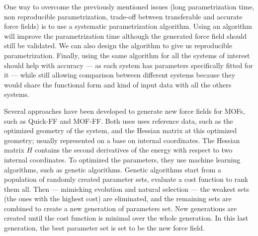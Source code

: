 \documentclass[thesis]{subfiles}
\begin{document}
One way to overcome the previously mentioned issues (long parametrization time,
non reproducible parametrization, trade-off between transferable and accurate
force fields) is to use a systematic parametrization algorithm. Using an
algorithm will improve the parametrization time although the generated force
field should still be validated. We can also design the algorithm to give us
reproducible parametrization. Finally, using the same algorithm for all the
systems of interest should help with accuracy --- as each system has parameters
specifically fitted for it --- while still allowing comparison between different
systems because they would share the functional form and kind of input data with
all the others systems.

Several approaches have been developed to generate new force fields for MOFs,
such as Quick-FF\cite{Vanduyfhuys2015} and MOF-FF\cite{Bureekaew2013}. Both uses
uses \abinitio reference data, such as the optimized geometry of the system, and
the Hessian matrix at this optimized geometry; usually represented on a base on
internal coordinates. The Hessian matrix $H$ contains the second derivatives of
the energy with respect to two internal coordinates. To optimized the
parameters, they use machine learning algorithms, such as genetic algorithms.
Genetic algorithms start from a population of randomly created parameter sets,
evaluate a cost function to rank them all. Then --- mimicking evolution
and natural selection --- the weakest sets (the ones with the highest cost) are
eliminated, and the remaining sets are combined to create a new generation of
parameters set. New generations are created until the cost function is minimal
over the whole generation. In this last generation, the best parameter set is
set to be the new force field.
\end{document}
